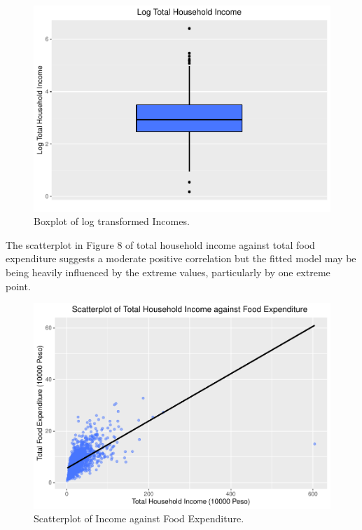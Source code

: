 \documentclass[
]{article}
\begin{document}
\begin{figure}[H]

{\centering \includegraphics[width=0.8\linewidth]{Group_01_files/figure-latex/balance boxplot2-1} 

}

\caption{Boxplot of log transformed Incomes.}\label{fig:balance boxplot2}
\end{figure}

The scatterplot in Figure 8 of total household income against total food
expenditure suggests a moderate positive correlation but the fitted
model may be being heavily influenced by the extreme values,
particularly by one extreme point.

\begin{figure}[H]

{\centering \includegraphics[width=0.8\linewidth]{Group_01_files/figure-latex/balance_plot-1} 

}

\caption{Scatterplot of Income against Food Expenditure.}\label{fig:balance_plot}
\end{figure}
\end{document}
